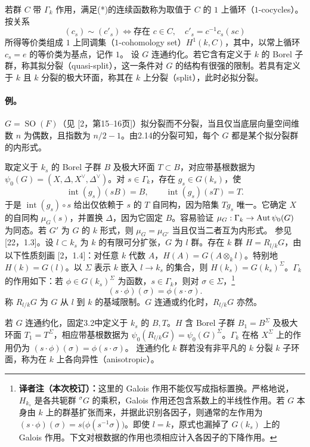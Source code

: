 若群 $C$ 带 $\Gamma_k$ 作用，满足(*)的连续函数称为取值于 $C$ 的 $1$ 上循环（$1$-cocycles）。按关系
\[
 (c_s)\sim(c'_s)\iff\text{存在 }c\in C,\quad c'_s=c^{-1}c_s(sc)
\]
所得等价类组成 $1$ 上同调集（$1$-cohomology set）$H^1(k,C)$，其中，以常上循环 $c_s=e$ 的等价类为基点，记作 $1$。
设 $G$ 连通约化。若它含有定义于 $k$ 的 Borel 子群，称其拟分裂（quasi-split），这一条件对 $G$ 的结构有很强的限制。若具有定义于 $k$ 且 $k$ 分裂的极大环面，称其在 $k$ 上分裂（split），此时必拟分裂。

\paragraph*{例。} $G=\operatorname{SO}(F)$（见 [2，第15--16页]）拟分裂而不分裂，当且仅当底层向量空间维数 $n$ 为偶数，且指数为 $n/2-1$。由2.14的分裂可知，每个 $G$ 都是某个拟分裂群的内形式。

取定义于 $k_s$ 的 Borel 子群 $B$ 及极大环面 $T\subset B$，对应带基根数据为 $\psi_0(G)=(X,\Delta,X^\vee,\Delta^\vee)$。对 $s\in\Gamma_k$，存在 $g_s\in G(k_s)$，使
\[
 \operatorname{int}(g_s)(sB)=B,\qquad\operatorname{int}(g_s)(sT)=T.
\]
于是 $\operatorname{int}(g_s)\circ s$ 给出仅依赖于 $s$ 的 $T$ 自同构，因为陪集 $Tg_s$ 唯一。它确定 $X$ 的自同构 $\mu_G(s)$，并置换 $\Delta$，因为它固定 $B$。容易验证 $\mu_G:\Gamma_k\to\operatorname{Aut}\psi_0(G)$ 为同态。若 $G'$ 为 $G$ 的 $k$ 形式，则 $\mu_G=\mu_{G'}$ 当且仅当二者互为内形式。
参见 [22，1.3]。设 $l\subset k_s$ 为 $k$ 的有限可分扩张，$G$ 为 $l$ 群。存在 $k$ 群 $H=R_{l/k}G$，由以下性质刻画 [2，1.4]：对任意 $k$ 代数 $A$，$H(A)=G(A\otimes_kl)$。特别地 $H(k)=G(l)$。以 $\Sigma$ 表示 $k$ 嵌入 $l\to k_s$ 的集合，则 $H(k_s)=G(k_s)^\Sigma$。$\Gamma_k$ 的作用如下：若 $\phi\in G(k_s)^\Sigma$ 为函数，$s\in\Gamma_k$，则对 $\sigma\in\Sigma$，\nobreak\footnote{\textbf{译者注（本次校订）：}这里的 Galois 作用不能仅写成指标置换。严格地说，$H_{k_s}$ 是各共轭群 ${}^{\sigma}G$ 的乘积，Galois 作用还包含系数上的半线性作用。若 $G$ 本身由 $k$ 上的群基扩张而来，并据此识别各因子，则通常的左作用为 $(s\cdot\phi)(\sigma)=s\bigl(\phi(s^{-1}\sigma)\bigr)$。即使 $l=k$，原式也漏掉了 $G(k_s)$ 上的 Galois 作用。下文对根数据的作用也须相应计入各因子的下降作用。}
\[
 (s\cdot\phi)(\sigma)=\phi(s\cdot\sigma).
\]
称 $R_{l/k}G$ 为 $G$ 从 $l$ 到 $k$ 的基域限制。$G$ 连通或约化时，$R_{l/k}G$ 亦然。

若 $G$ 连通约化，固定3.2中定义于 $k_s$ 的 $B,T$。$H$ 含 Borel 子群 $B_1=B^\Sigma$ 及极大环面 $T_1=T^\Sigma$，相应带基根数据为 $\psi_0(R_{l/k}G)=\psi_0(G)^\Sigma$。$\Gamma_k$ 在格 $X^\Sigma$ 上的作用仍为 $(s\cdot\phi)(\sigma)=\phi(s\cdot\sigma)$。
连通约化 $k$ 群若没有非平凡的 $k$ 分裂 $k$ 子环面，称为在 $k$ 上各向异性（anisotropic）。

